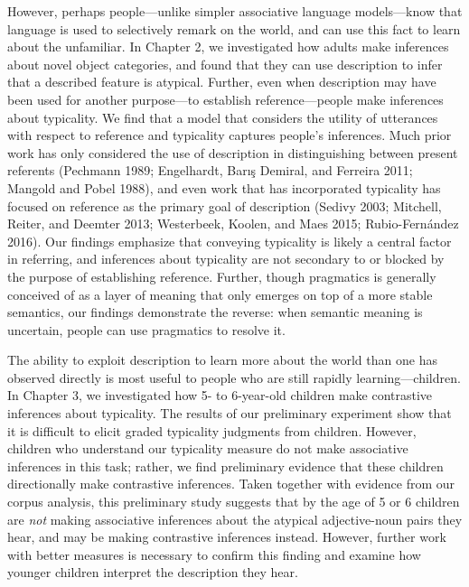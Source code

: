 \documentclass{ucetd}
\begin{document}
However, perhaps people---unlike simpler associative language
models---know that language is used to selectively remark on the world,
and can use this fact to learn about the unfamiliar. In Chapter 2, we
investigated how adults make inferences about novel object categories,
and found that they can use description to infer that a described
feature is atypical. Further, even when description may have been used
for another purpose---to establish reference---people make inferences
about typicality. We find that a model that considers the utility of
utterances with respect to reference and typicality captures people's
inferences. Much prior work has only considered the use of description
in distinguishing between present referents (Pechmann 1989; Engelhardt,
Barış Demiral, and Ferreira 2011; Mangold and Pobel 1988), and even work
that has incorporated typicality has focused on reference as the primary
goal of description (Sedivy 2003; Mitchell, Reiter, and Deemter 2013;
Westerbeek, Koolen, and Maes 2015; Rubio-Fernández 2016). Our findings
emphasize that conveying typicality is likely a central factor in
referring, and inferences about typicality are not secondary to or
blocked by the purpose of establishing reference. Further, though
pragmatics is generally conceived of as a layer of meaning that only
emerges on top of a more stable semantics, our findings demonstrate the
reverse: when semantic meaning is uncertain, people can use pragmatics
to resolve it.

The ability to exploit description to learn more about the world than
one has observed directly is most useful to people who are still rapidly
learning---children. In Chapter 3, we investigated how 5- to 6-year-old
children make contrastive inferences about typicality. The results of
our preliminary experiment show that it is difficult to elicit graded
typicality judgments from children. However, children who understand our
typicality measure do not make associative inferences in this task;
rather, we find preliminary evidence that these children directionally
make contrastive inferences. Taken together with evidence from our
corpus analysis, this preliminary study suggests that by the age of 5 or
6 children are \emph{not} making associative inferences about the
atypical adjective-noun pairs they hear, and may be making contrastive
inferences instead. However, further work with better measures is
necessary to confirm this finding and examine how younger children
interpret the description they hear.
\end{document}
